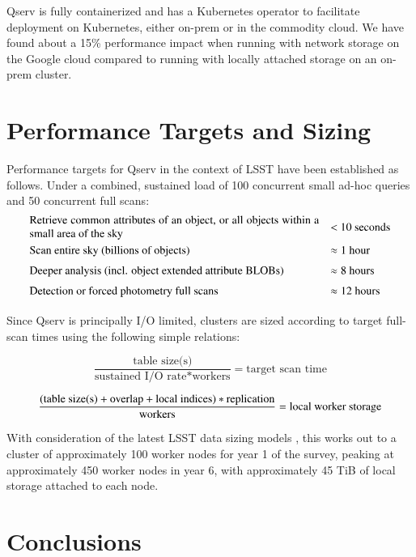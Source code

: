 \documentclass[11pt,twoside]{article}
\begin{document}
Qserv is fully containerized and has a Kubernetes operator to facilitate deployment on Kubernetes, either
on-prem or in the commodity cloud.  We have found about a 15\% performance impact when running with network
storage on the Google cloud compared to running with locally attached storage on an on-prem cluster.

\section{Performance Targets and Sizing}

Performance targets for Qserv in the context of LSST have been established as follows.  Under a combined,
sustained load of 100 concurrent small ad-hoc queries and 50 concurrent full scans:
\[
{\renewcommand{\arraystretch}{1.5}\begin{array}{ll}
  \parbox{9cm}{Retrieve common attributes of an object, or all objects within a small area of the sky}
    & \mbox{< 10 seconds} \\
  \mbox{Scan entire sky (billions of objects)}
    & \mbox{$\approx{}$1 hour} \\
  \mbox{Deeper analysis (incl. object extended attribute BLOBs)}
    & \mbox{$\approx{}$8 hours} \\
  \mbox{Detection or forced photometry full scans}
    & \mbox{$\approx{}$12 hours} \\
\end{array}}
\]

Since Qserv is principally I/O limited, clusters are sized according to target full-scan times using the
following simple relations:

\[
    \frac{\text{table size(s)}}{\text{sustained I/O rate} * \text{workers}} = \text{target scan time}
\]

\[
    \frac{(\text{table size(s)} + \text{overlap} + \text{local indices}) * \text{replication}}
    {\text{workers}} = \text{local worker storage} \\
\]

With consideration of the latest LSST data sizing models \citep{DMTN-135}, this works out to a cluster of
approximately 100 worker nodes for year 1 of the survey, peaking at approximately 450 worker nodes in year 6,
with approximately 45 TiB of local storage attached to each node.

\section{Conclusions}
\end{document}
